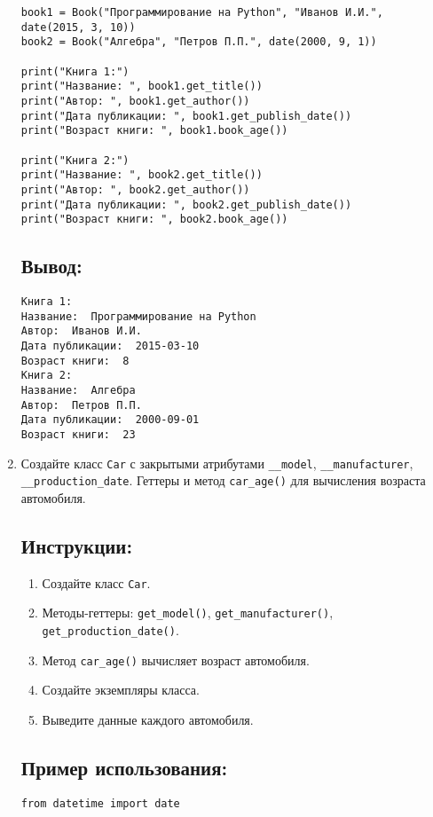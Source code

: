 \begin{enumerate}
\begin{lstlisting}[caption=Пример кода]
book1 = Book("Программирование на Python", "Иванов И.И.", date(2015, 3, 10))
book2 = Book("Алгебра", "Петров П.П.", date(2000, 9, 1))

print("Книга 1:")
print("Название: ", book1.get_title())
print("Автор: ", book1.get_author())
print("Дата публикации: ", book1.get_publish_date())
print("Возраст книги: ", book1.book_age())

print("Книга 2:")
print("Название: ", book2.get_title())
print("Автор: ", book2.get_author())
print("Дата публикации: ", book2.get_publish_date())
print("Возраст книги: ", book2.book_age())
\end{lstlisting}

\subsection*{Вывод:}
\begin{lstlisting}[caption=Ожидаемый вывод]
Книга 1:
Название:  Программирование на Python
Автор:  Иванов И.И.
Дата публикации:  2015-03-10
Возраст книги:  8
Книга 2:
Название:  Алгебра
Автор:  Петров П.П.
Дата публикации:  2000-09-01
Возраст книги:  23
\end{lstlisting}

\item
Создайте класс \texttt{Car} с закрытыми атрибутами \texttt{\_\_model}, \texttt{\_\_manufacturer}, \texttt{\_\_production\_date}. Геттеры и метод \texttt{car\_age()} для вычисления возраста автомобиля.

\subsection*{Инструкции:}
\begin{enumerate}
    \item Создайте класс \texttt{Car}.
    \item Методы-геттеры: \texttt{get\_model()}, \texttt{get\_manufacturer()}, \texttt{get\_production\_date()}.
    \item Метод \texttt{car\_age()} вычисляет возраст автомобиля.
    \item Создайте экземпляры класса.
    \item Выведите данные каждого автомобиля.
\end{enumerate}

\subsection*{Пример использования:}
\begin{lstlisting}[caption=Пример кода]
from datetime import date


\end{lstlisting}
\end{enumerate}
